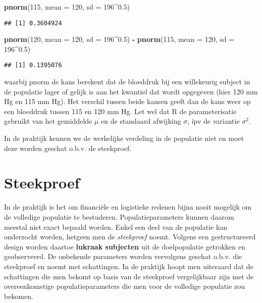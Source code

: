 \documentclass[12pt,dutch,coursenotes]{book}
\newenvironment{Shaded}{\begin{snugshade}}{\end{snugshade}}
\newcommand{\KeywordTok}[1]{\textcolor[rgb]{0.13,0.29,0.53}{\textbf{#1}}}
\newcommand{\DataTypeTok}[1]{\textcolor[rgb]{0.13,0.29,0.53}{#1}}
\newcommand{\DecValTok}[1]{\textcolor[rgb]{0.00,0.00,0.81}{#1}}
\newcommand{\FloatTok}[1]{\textcolor[rgb]{0.00,0.00,0.81}{#1}}
\newcommand{\StringTok}[1]{\textcolor[rgb]{0.31,0.60,0.02}{#1}}
\newcommand{\OperatorTok}[1]{\textcolor[rgb]{0.81,0.36,0.00}{\textbf{#1}}}
\newcommand{\NormalTok}[1]{#1}
\theoremstyle{definition}
\theoremstyle{definition}
\theoremstyle{definition}
\theoremstyle{remark}
\begin{document}
\begin{Shaded}
\begin{Highlighting}[]
\KeywordTok{pnorm}\NormalTok{(}\DecValTok{115}\NormalTok{, }\DataTypeTok{mean =} \DecValTok{120}\NormalTok{, }\DataTypeTok{sd =} \DecValTok{196}\OperatorTok{^}\FloatTok{0.5}\NormalTok{)}
\end{Highlighting}
\end{Shaded}

\begin{verbatim}
## [1] 0.3604924
\end{verbatim}

\begin{Shaded}
\begin{Highlighting}[]
\KeywordTok{pnorm}\NormalTok{(}\DecValTok{120}\NormalTok{, }\DataTypeTok{mean =} \DecValTok{120}\NormalTok{, }\DataTypeTok{sd =} \DecValTok{196}\OperatorTok{^}\FloatTok{0.5}\NormalTok{) }\OperatorTok{-}\StringTok{ }\KeywordTok{pnorm}\NormalTok{(}\DecValTok{115}\NormalTok{, }\DataTypeTok{mean =} \DecValTok{120}\NormalTok{, }
    \DataTypeTok{sd =} \DecValTok{196}\OperatorTok{^}\FloatTok{0.5}\NormalTok{)}
\end{Highlighting}
\end{Shaded}

\begin{verbatim}
## [1] 0.1395076
\end{verbatim}

waarbij pnorm de kans berekent dat de bloeddruk bij een willekeurig
subject in de populatie lager of gelijk is aan het kwantiel dat wordt
opgegeven (hier 120 mm Hg en 115 mm Hg). Het verschil tussen beide
kansen geeft dan de kans weer op een bloeddruk tussen 115 en 120 mm Hg.
Let wel dat R de parameterisatie gebruikt van het gemiddelde \(\mu\) en
de standaard afwijking \(\sigma\), ipv de variantie \(\sigma^2\).

In de praktijk kennen we de werkelijke verdeling in de populatie niet en
moet deze worden geschat o.b.v. de steekproef.

\section{Steekproef}\label{steekproef}

In de praktijk is het om financiële en logistieke redenen bijna nooit
mogelijk om de volledige populatie te bestuderen. Populatieparameters
kunnen daarom meestal niet exact bepaald worden. Enkel een deel van de
populatie kan onderzocht worden, hetgeen men de \emph{steekproef} noemt.
Volgens een gestructureerd design worden daartoe \textbf{lukraak
subjecten} uit de doelpopulatie getrokken en geobserveerd. De onbekende
parameters worden vervolgens geschat o.b.v. die steekproef en noemt met
schattingen. In de praktijk hoopt men uiteraard dat de schattingen die
men bekomt op basis van de steekproef vergelijkbaar zijn met de
overeenkomstige populatieparameters die men voor de volledige populatie
zou bekomen.
\end{document}
